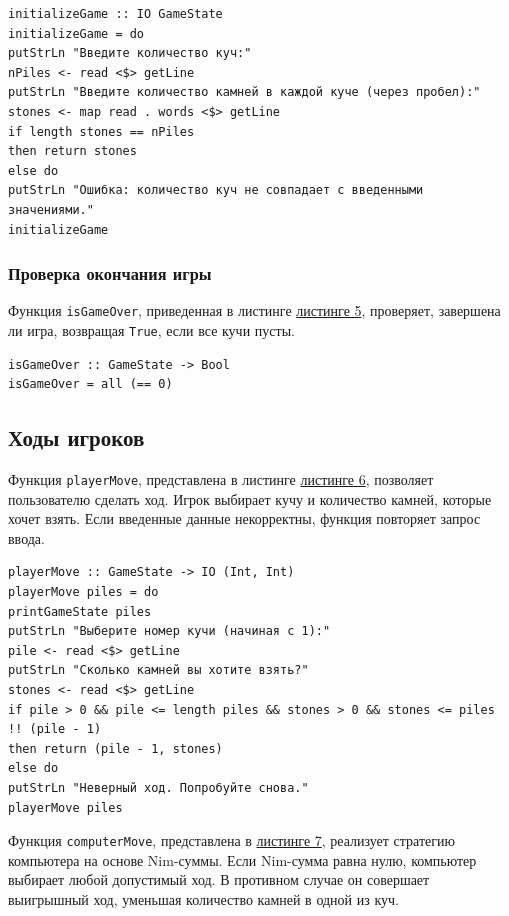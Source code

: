 \documentclass[11pt,a4paper,final]{article} %
\begin{document}
\begin{lstlisting}[caption={Инициализация игры}, label={lst:init}]
initializeGame :: IO GameState
initializeGame = do
putStrLn "Введите количество куч:"
nPiles <- read <$> getLine
putStrLn "Введите количество камней в каждой куче (через пробел):"
stones <- map read . words <$> getLine
if length stones == nPiles
then return stones
else do
putStrLn "Ошибка: количество куч не совпадает с введенными значениями."
initializeGame
\end{lstlisting}

\subsubsection{Проверка окончания игры}

Функция \texttt{isGameOver}, приведенная в листинге \hyperref[lst:isGameOver]{листинге 5}, проверяет, завершена ли игра, возвращая \texttt{True}, если все кучи пусты.

\begin{lstlisting}[caption={Проверка окончания игры}, label={lst:isGameOver}]
isGameOver :: GameState -> Bool
isGameOver = all (== 0)
\end{lstlisting}

\subsection{Ходы игроков}

Функция \texttt{playerMove}, представлена в листинге \hyperref[lst:playerMove]{листинге 6}, позволяет пользователю сделать ход. Игрок выбирает кучу и количество камней, которые хочет взять. Если введенные данные некорректны, функция повторяет запрос ввода.

\begin{lstlisting}[caption={Ход игрока}, label={lst:playerMove}]
playerMove :: GameState -> IO (Int, Int)
playerMove piles = do
printGameState piles
putStrLn "Выберите номер кучи (начиная с 1):"
pile <- read <$> getLine
putStrLn "Сколько камней вы хотите взять?"
stones <- read <$> getLine
if pile > 0 && pile <= length piles && stones > 0 && stones <= piles !! (pile - 1)
then return (pile - 1, stones)
else do
putStrLn "Неверный ход. Попробуйте снова."
playerMove piles
\end{lstlisting}

Функция \texttt{computerMove}, представлена в \hyperref[lst:computerMove]{листинге 7}, реализует стратегию компьютера на основе Nim-суммы. Если Nim-сумма равна нулю, компьютер выбирает любой допустимый ход. В противном случае он совершает выигрышный ход, уменьшая количество камней в одной из куч.
\end{document}

